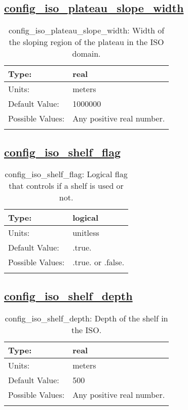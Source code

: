 \subsection[config\_iso\_plateau\_slope\_width]{\hyperref[sec:nm_tab_iso]{config\_iso\_plateau\_slope\_width}}
\label{subsec:nm_sec_config_iso_plateau_slope_width}
\begin{center}
\begin{longtable}{| p{2.0in} || p{4.0in} |}
    \hline
    Type: & real \\
    \hline
    Units: & \si{meters} \\
    \hline
    Default Value: & 1000000 \\
    \hline
    Possible Values: & Any positive real number. \\
    \hline
    \caption{config\_iso\_plateau\_slope\_width: Width of the sloping region of the plateau in the ISO domain.}
\end{longtable}
\end{center}
\subsection[config\_iso\_shelf\_flag]{\hyperref[sec:nm_tab_iso]{config\_iso\_shelf\_flag}}
\label{subsec:nm_sec_config_iso_shelf_flag}
\begin{center}
\begin{longtable}{| p{2.0in} || p{4.0in} |}
    \hline
    Type: & logical \\
    \hline
    Units: & \si{unitless} \\
    \hline
    Default Value: & .true. \\
    \hline
    Possible Values: & .true. or .false. \\
    \hline
    \caption{config\_iso\_shelf\_flag: Logical flag that controls if a shelf is used or not.}
\end{longtable}
\end{center}
\subsection[config\_iso\_shelf\_depth]{\hyperref[sec:nm_tab_iso]{config\_iso\_shelf\_depth}}
\label{subsec:nm_sec_config_iso_shelf_depth}
\begin{center}
\begin{longtable}{| p{2.0in} || p{4.0in} |}
    \hline
    Type: & real \\
    \hline
    Units: & \si{meters} \\
    \hline
    Default Value: & 500 \\
    \hline
    Possible Values: & Any positive real number. \\
    \hline
    \caption{config\_iso\_shelf\_depth: Depth of the shelf in the ISO.}
\end{longtable}
\end{center}
